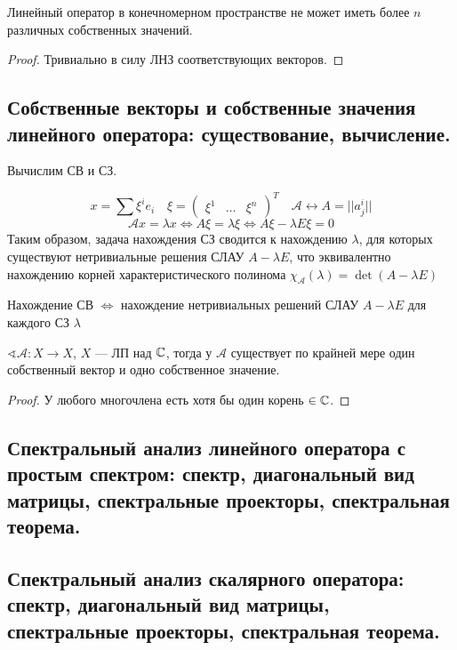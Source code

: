 \begin{lemma}
    Линейный оператор в конечномерном пространстве не может иметь более $n$ различных собственных значений.
\end{lemma}
\begin{proof}
    Тривиально в силу ЛНЗ соответствующих векторов.
\end{proof}

\subsection{Собственные векторы и собственные значения линейного оператора: существование, вычисление. }

Вычислим СВ и СЗ.

$$x = \sum \xi^i e_i \quad \xi = \begin{pmatrix}
    \xi^1 & \ldots & \xi^n
\end{pmatrix}^T \quad \mathcal A \leftrightarrow A = ||a^i_j||$$
$$\mathcal A x = \lambda x \Leftrightarrow A \xi = \lambda \xi \Leftrightarrow A \xi - \lambda E \xi = 0$$
Таким образом, задача нахождения СЗ сводится к нахождению $\lambda$, для которых существуют нетривиальные решения СЛАУ $A-\lambda E$, что эквивалентно нахождению корней характеристического полинома $\chi_{\mathcal A}(\lambda) = \det(A - \lambda E)$

Нахождение СВ $\Leftrightarrow$ нахождение нетривиальных решений СЛАУ $A - \lambda E$ для каждого СЗ $\lambda$     

\begin{lemma}
    $\sphericalangle \mathcal A : X \to X$, $X$ --- ЛП над $\mathbb{C}$, тогда у $\mathcal A$ существует по крайней мере один собственный вектор и одно собственное значение.    
\end{lemma}
\begin{proof}
    У любого многочлена есть хотя бы один корень $\in \mathbb{C}$.
\end{proof}

\subsection{Спектральный анализ линейного оператора с простым спектром: спектр, диагональный вид матрицы, спектральные проекторы, спектральная теорема.}


\subsection{Спектральный анализ скалярного оператора: спектр, диагональный вид матрицы, спектральные проекторы, спектральная теорема.}


